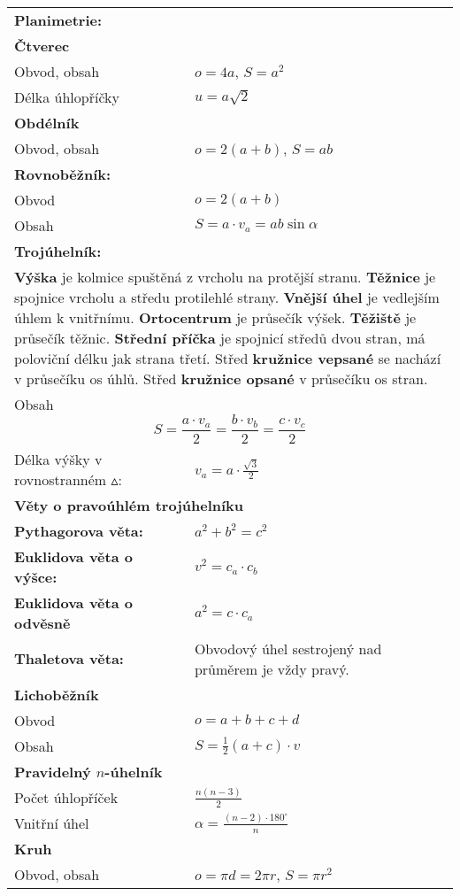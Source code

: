 \documentclass[10pt,a4paper]{article}
\newcommand{\nazv}[1]{{\large \textbf{\textsf{#1}}}}
\begin{document}
\begin{tabular}{p{5cm}p{5cm}}

\multicolumn{2}{l}{\nazv{Planimetrie:}}\\
\multicolumn{2}{l}{\textbf{Čtverec}}\\
Obvod, obsah&$o=4a$, $S=a^2$\\
Délka úhlopříčky& $u=a\sqrt{2}$\\
\multicolumn{2}{l}{\textbf{Obdélník}}\\
Obvod, obsah&$o=2(a+b)$, $S=ab$\\
\multicolumn{2}{l}{\textbf{Rovnoběžník:}}\\
Obvod&$o=2(a+b)$\\
Obsah&$S=a\cdot v_a=ab\sin\alpha$\\
\multicolumn{2}{l}{\textbf{Trojúhelník:}}\\
\multicolumn{2}{p{10cm}}{\textbf{Výška} je kolmice spuštěná z vrcholu na protější stranu. \textbf{Těžnice} je spojnice vrcholu a středu protilehlé strany. \textbf{Vnější úhel} je vedlejším úhlem k vnitřnímu. \textbf{Ortocentrum} je průsečík výšek. \textbf{Těžiště} je průsečík těžnic. \textbf{Střední příčka} je spojnicí středů dvou stran, má poloviční délku jak strana třetí. Střed \textbf{kružnice vepsané} se nachází v průsečíku os úhlů. Střed \textbf{kružnice opsané} v průsečíku os stran.}\\
\multicolumn{2}{p{9.5cm}}{Obsah$$S=\frac{a\cdot v_a}{2}=\frac{b\cdot v_b}{2}=\frac{c\cdot v_c}{2}$$}\\
Délka výšky v rovnostranném $\vartriangle$:&$v_a=a\cdot\frac{\sqrt{3}}{2}$\\
\multicolumn{2}{l}{\textbf{Věty o pravoúhlém trojúhelníku}}\\
\textbf{Pythagorova věta:}& $a^2+b^2=c^2$\\
\textbf{Euklidova věta o výšce:}& $v^2=c_a\cdot c_b$\\
\textbf{Euklidova věta o odvěsně}& $a^2=c\cdot c_a$\\\textbf{Thaletova věta:}& Obvodový úhel sestrojený nad průměrem je vždy pravý. \\
\multicolumn{2}{l}{\textbf{Lichoběžník}}\\
Obvod&$o=a+b+c+d$\\
Obsah& $S=\frac{1}{2}(a+c)\cdot v$\\
\multicolumn{2}{l}{\textbf{Pravidelný $n$-úhelník}}\\
Počet úhlopříček& $\frac{n(n-3)}{2}$\\
Vnitřní úhel& $\alpha=\frac{(n-2)\cdot 180^{\circ}}{n}$\\
\textbf{Kruh}&\\
Obvod, obsah& $o=\pi d=2\pi r$, $S=\pi r^2$\\
\end{tabular}%
\end{document}
